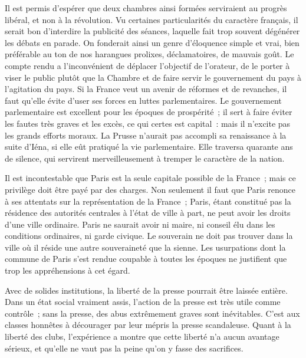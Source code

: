 \documentclass[french,twoside]{book} %
\begin{document}
Il est permis d’espérer que deux chambres ainsi formées serviraient au progrès libéral, et non à la révolution. Vu certaines particularités du caractère français, il serait bon d’interdire la publicité des séances, laquelle fait trop souvent dégénérer les débats en parade. On fonderait ainsi un genre d’éloquence simple et vrai, bien préférable au ton de nos harangues prolixes, déclamatoires, de mauvais goût. Le compte rendu a l’inconvénient de déplacer l’objectif de l’orateur, de le porter à viser le public plutôt que la Chambre et de faire servir le gouvernement du pays à l’agitation du pays. Si la France veut un avenir de réformes et de revanches, il faut qu’elle évite d’user ses forces en luttes parlementaires. Le gouvernement parlementaire est excellent pour les époques de prospérité ; il sert à faire éviter les fautes très graves et les excès, ce qui certes est capital : mais il n’excite pas les grands efforts moraux. La Prusse n’aurait pas accompli sa renaissance à la suite d’Iéna, si elle eût pratiqué la vie parlementaire. Elle traversa quarante ans de silence, qui servirent merveilleusement à tremper le caractère de la nation.\par
Il est incontestable que Paris est la seule capitale possible de la France ; mais ce privilège doit être payé par des charges. Non seulement il faut que Paris renonce à ses attentats sur la représentation de la France ; Paris, étant constitué pas la résidence des autorités centrales à l’état de ville à part, ne peut avoir les droits d’une ville ordinaire. Paris ne saurait avoir ni maire, ni conseil élu dans les conditions ordinaires, ni garde civique. Le souverain ne doit pas trouver dans la ville où il réside une autre souveraineté que la sienne. Les usurpations dont la commune de Paris s’est rendue coupable à toutes les époques ne justifient que trop les appréhensions à cet égard.\par
Avec de solides institutions, la liberté de la presse pourrait être laissée entière. Dans un état social vraiment assis, l’action de la presse est très utile comme contrôle ; sans la presse, des abus extrêmement graves sont inévitables. C’est aux classes honnêtes à décourager par leur mépris la presse scandaleuse. Quant à la liberté des clubs, l’expérience a montre que cette liberté n’a aucun avantage sérieux, et qu’elle ne vaut pas la peine qu’on y fasse des sacrifices.\par
\end{document}
